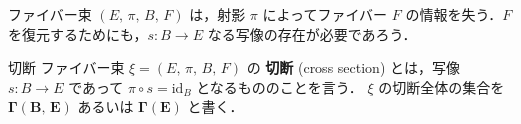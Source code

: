 \documentclass[TQFT_main]{subfiles}
\begin{document}


ファイバー束 $(E,\, \pi,\, B,\, F)$ は，射影 $\pi$ によってファイバー $F$ の情報を失う．$F$ を復元するためにも，$s \colon B \to E$ なる写像の存在が必要であろう．

\begin{mydef}[label=def.section]{\cinfty 切断}
	ファイバー束 $\xi = (E,\, \pi,\, B,\, F)$ の \cinfty \textbf{切断} (cross section) とは，\cinfty 写像 $s \colon B \to E$ であって $ \pi \circ s = \mathrm{id}_B$ となるもののことを言う．
    \tcblower 
    $\xi$ の切断全体の集合を $\bm{\Gamma (B,\, E)}$ あるいは $\bm{\Gamma(E)}$ と書く．
\end{mydef}

\end{document}
